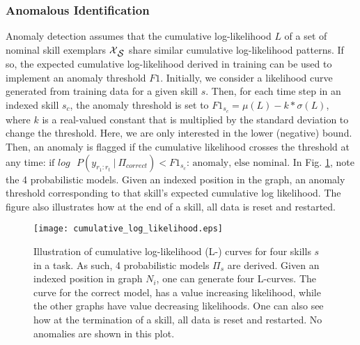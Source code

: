 \documentclass[letterpaper, 10 pt, conference]{ieeeconf}  %
\newcommand\given[1][]{\:#1\vert\:}
\begin{document}
\subsubsection{Anomalous Identification} \label{subsubsec:anomalous}
Anomaly detection assumes that the cumulative log-likelihood $L$ of a set of nominal skill exemplars $\mbox{$\mathcal X$}_{\mbox{$\mathcal S$}}$ share similar cumulative log-likelihood patterns. If so, the expected cumulative log-likelihood derived in training can be used to implement an anomaly threshold $F1$. Initially, we consider a likelihood curve generated from training data for a given skill $s$. Then, for each time step in an indexed skill $s_c$, the anomaly threshold is set to $F1_{s_c}=\mu(L)-k*\sigma(L)$, where $k$ is a real-valued constant that is multiplied by the standard deviation to change the threshold. Here, we are only interested in the lower (negative) bound. Then, an anomaly is flagged if the cumulative likelihood crosses the threshold at any time: $\mbox{if } log \mbox{ } P(y_{r_1:r_t}  \given \Pi_{correct}) < F1_{s_c} \mbox{: anomaly, else nominal}$. In Fig. \ref{fig:likelihoods}, note the 4 probabilistic models. Given an indexed position in the graph, an anomaly threshold corresponding to that skill's expected cumulative log likelihood. The figure also illustrates how at the end of a skill, all data is reset and restarted. 
\begin{figure}[t]     
	\centering		
		\texttt{[image: cumulative\_log\_likelihood.eps]}
		\caption{Illustration of cumulative log-likelihood (L-) curves for four skills $s$ in a task. As such, 4 probabilistic models $\Pi_s$ are derived. Given an indexed position in graph $N_i$, one can generate four L-curves. The curve for the correct model, has a value increasing likelihood, while the other graphs have value decreasing likelihoods. One can also see how at the termination of a skill, all data is reset and restarted. No anomalies are shown in this plot.}
        \label{fig:likelihoods}        
\end{figure}
\end{document}
